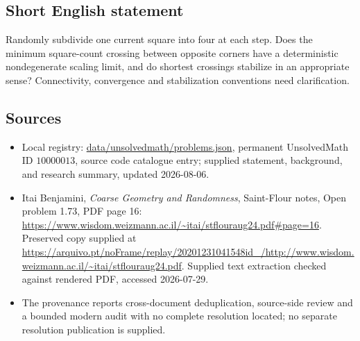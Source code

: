 \documentclass[11pt]{article}
\begin{document}
\subsection{Short English statement}
Randomly subdivide one current square into four at each step. Does the minimum square-count crossing between opposite corners have a deterministic nondegenerate scaling limit, and do shortest crossings stabilize in an appropriate sense? Connectivity, convergence and stabilization conventions need clarification.
\subsection{Sources}
\begin{itemize}
\item Local registry: \url{data/unsolvedmath/problems.json}, permanent UnsolvedMath ID \(10000013\), source code catalogue entry; supplied statement, background, and research summary, updated 2026-08-06.
\item Itai Benjamini, \emph{Coarse Geometry and Randomness}, Saint-Flour notes, Open problem 1.73, PDF page 16: \url{https://www.wisdom.weizmann.ac.il/~itai/stflouraug24.pdf#page=16}. Preserved copy supplied at \url{https://arquivo.pt/noFrame/replay/20201231041548id_/http://www.wisdom.weizmann.ac.il/~itai/stflouraug24.pdf}. Supplied text extraction checked against rendered PDF, accessed 2026-07-29.
\item The provenance reports cross-document deduplication, source-side review and a bounded modern audit with no complete resolution located; no separate resolution publication is supplied.
\end{itemize}
\end{document}
